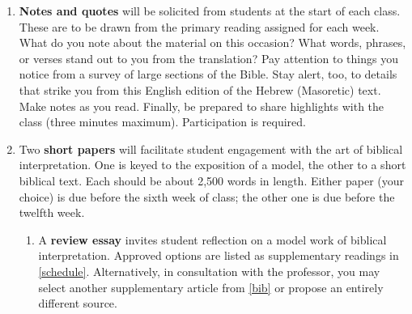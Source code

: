 \documentclass[titlepage]{article}
\begin{document}
\begin{enumerate}

	\item \textbf{Notes and quotes} will be solicited from students at the
	start of each class. These are to be drawn from the primary reading
	assigned for each week. What do you note about the material on this
	occasion? What words, phrases, or verses stand out to you from the
	\cite{njps} translation? Pay attention to things you notice from a
	survey of large sections of the Bible. Stay alert, too, to details that
	strike you from this English edition of the Hebrew (Masoretic) text.
	Make notes as you read. Finally, be prepared to share highlights with
	the class (three minutes maximum). Participation is required.


	\item Two \textbf{short papers} will facilitate student engagement
	with the art of biblical interpretation. One is keyed to the
	exposition of a model, the other to a short biblical text. Each
	should be about 2,500 words in length. Either paper (your choice) is
	due before the sixth week of class; the other one is due before the
	twelfth week.

	\begin{enumerate}

		\item A \textbf{review essay} invites student reflection on a model
		work of biblical interpretation. Approved options are listed as
		supplementary readings in \autoref{schedule}. Alternatively, in
		consultation with the professor, you may select another
		supplementary article from \autoref{bib} or propose an entirely
		different source.


\end{enumerate}
\end{enumerate}
\end{document}
